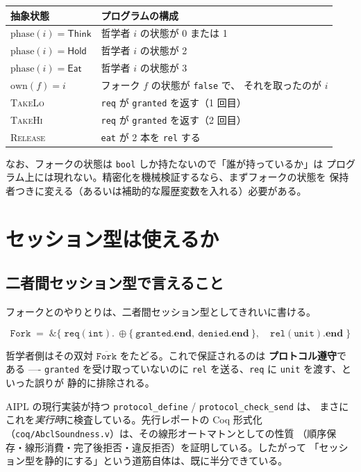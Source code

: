 \documentclass[11pt,a4paper]{ltjsarticle}
\theoremstyle{definition}
\theoremstyle{remark}
\newcommand{\tint}{\mathtt{int}}
\newcommand{\tunit}{\mathtt{unit}}
\begin{document}
\begin{center}
\begin{tabular}{@{}ll@{}}
\toprule
抽象状態 & プログラムの構成 \\
\midrule
$\mathrm{phase}(i) = \textsf{Think}$ & 哲学者 $i$ の状態が 0 または 1 \\
$\mathrm{phase}(i) = \textsf{Hold}$  & 哲学者 $i$ の状態が 2 \\
$\mathrm{phase}(i) = \textsf{Eat}$   & 哲学者 $i$ の状態が 3 \\
$\mathrm{own}(f) = i$ & フォーク $f$ の状態が \texttt{false} で、
                        それを取ったのが $i$ \\
\textsc{TakeLo} & \texttt{req} が \texttt{granted} を返す（1 回目）\\
\textsc{TakeHi} & \texttt{req} が \texttt{granted} を返す（2 回目）\\
\textsc{Release} & \texttt{eat} が 2 本を \texttt{rel} する \\
\bottomrule
\end{tabular}
\end{center}

なお、フォークの状態は \texttt{bool} しか持たないので「誰が持っているか」は
プログラム上には現れない。精密化を機械検証するなら、まずフォークの状態を
保持者つきに変える（あるいは補助的な履歴変数を入れる）必要がある。

\section{セッション型は使えるか}
\label{sec:session}

\subsection{二者間セッション型で言えること}

フォークとのやりとりは、二者間セッション型としてきれいに書ける。

\[
\texttt{Fork} \;=\; \&\bigl\{\;
  \mathtt{req}(\tint).\ \oplus\{\ \mathtt{granted}.\mathbf{end},\
                                  \mathtt{denied}.\mathbf{end}\ \},\quad
  \mathtt{rel}(\tunit).\mathbf{end}
\;\bigr\}
\]

哲学者側はその双対 $\overline{\texttt{Fork}}$ をたどる。これで保証されるのは
\textbf{プロトコル遵守}である ---- \texttt{granted} を受け取っていないのに
\texttt{rel} を送る、\texttt{req} に \texttt{unit} を渡す、といった誤りが
静的に排除される。

AIPL の現行実装が持つ \verb|protocol_define| / \verb|protocol_check_send| は、
まさにこれを\emph{実行時}に検査している。先行レポートの Coq 形式化
（\verb|coq/AbclSoundness.v|）は、その線形オートマトンとしての性質
（順序保存・線形消費・完了後拒否・違反拒否）を証明している。したがって
「セッション型を静的にする」という道筋自体は、既に半分できている。
\end{document}
